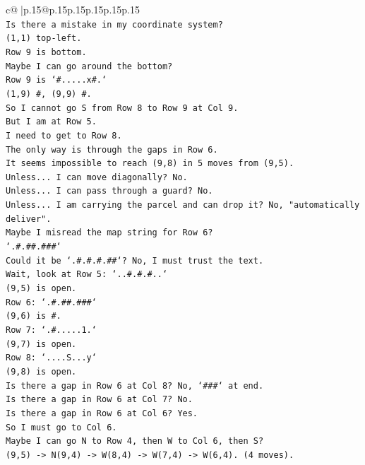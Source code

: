 \documentclass{article}
\begin{document}
{\begin{supertabular}{c@{$\;$}|p{.15\linewidth}@{}p{.15\linewidth}p{.15\linewidth}p{.15\linewidth}p{.15\linewidth}p{.15\linewidth}}
{{{\\ 
\texttt{Is there a mistake in my coordinate system?} \\
\texttt{(1,1) top{-}left.} \\
\texttt{Row 9 is bottom.} \\
\texttt{Maybe I can go around the bottom?} \\
\texttt{Row 9 is `\#.....x\#.`} \\
\texttt{(1,9) \#, (9,9) \#.} \\
\texttt{So I cannot go S from Row 8 to Row 9 at Col 9.} \\
\texttt{But I am at Row 5.} \\
\texttt{I need to get to Row 8.} \\
\texttt{The only way is through the gaps in Row 6.} \\
\texttt{It seems impossible to reach (9,8) in 5 moves from (9,5).} \\
\texttt{Unless... I can move diagonally? No.} \\
\texttt{Unless... I can pass through a guard? No.} \\
\texttt{Unless... I am carrying the parcel and can drop it? No, "automatically deliver".} \\
\texttt{Maybe I misread the map string for Row 6?} \\
\texttt{`.\#.\#\#.\#\#\#`} \\
\texttt{Could it be `.\#.\#.\#.\#\#`? No, I must trust the text.} \\
\texttt{Wait, look at Row 5: `..\#.\#.\#..`} \\
\texttt{(9,5) is open.} \\
\texttt{Row 6: `.\#.\#\#.\#\#\#`} \\
\texttt{(9,6) is \#.} \\
\texttt{Row 7: `.\#.....1.`} \\
\texttt{(9,7) is open.} \\
\texttt{Row 8: `....S...y`} \\
\texttt{(9,8) is open.} \\
\texttt{Is there a gap in Row 6 at Col 8? No, `\#\#\#` at end.} \\
\texttt{Is there a gap in Row 6 at Col 7? No.} \\
\texttt{Is there a gap in Row 6 at Col 6? Yes.} \\
\texttt{So I must go to Col 6.} \\
\texttt{Maybe I can go N to Row 4, then W to Col 6, then S?} \\
\texttt{(9,5) {-}> N(9,4) {-}> W(8,4) {-}> W(7,4) {-}> W(6,4). (4 moves).} \\
}}}
\end{supertabular}}
\end{document}
